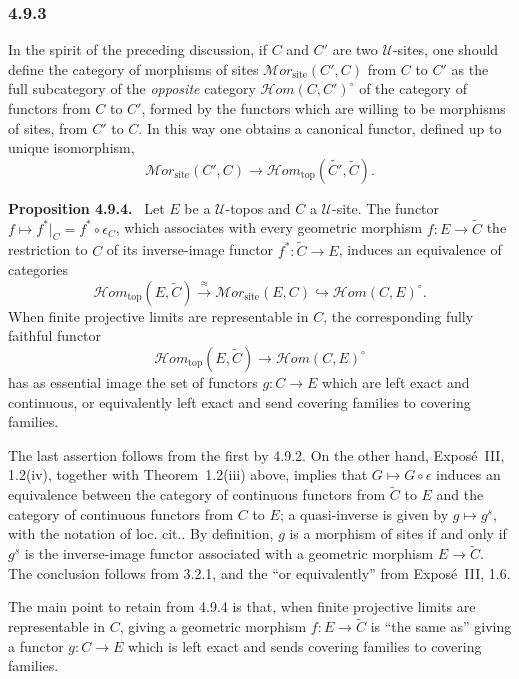 \documentclass[11pt]{article}
\newcommand{\U}{\mathcal{U}}
\newcommand{\Hhom}{\mathcal{H}om}
\newcommand{\Hhomtop}{\mathcal{H}om_{\mathrm{top}}}
\newcommand{\Mmorsite}{\mathcal{M}or_{\mathrm{site}}}
\newcommand{\loccit}{loc. cit.}
\newenvironment{statement}[1]{\par\medskip\noindent\textbf{#1.}\ }{\par\medskip}
\begin{document}
\subsubsection*{4.9.3}
In the spirit of the preceding discussion, if \(C\) and \(C'\) are two \(\U\)-sites, one should define the category of morphisms of sites \(\Mmorsite(C',C)\) from \(C\) to \(C'\) as the full subcategory of the \emph{opposite} category \(\Hhom(C,C')^\circ\) of the category of functors from \(C\) to \(C'\), formed by the functors which are willing to be morphisms of sites, from \(C'\) to \(C\). In this way one obtains a canonical functor, defined up to unique isomorphism,
\[
\Mmorsite(C',C)\longrightarrow
\Hhomtop(\widetilde{C'},\widetilde C).
\]

\begin{statement}{Proposition 4.9.4}
Let \(E\) be a \(\U\)-topos and \(C\) a \(\U\)-site. The functor \(f\mapsto f^\ast|_C=f^\ast\circ\epsilon_C\), which associates with every geometric morphism \(f:E\to\widetilde C\) the restriction to \(C\) of its inverse-image functor \(f^\ast:\widetilde C\to E\), induces an equivalence of categories
\[
\Hhomtop(E,\widetilde C)\xrightarrow{\approx}
\Mmorsite(E,C)\hookrightarrow\Hhom(C,E)^\circ.
\]
When finite projective limits are representable in \(C\), the corresponding fully faithful functor
\[
\Hhomtop(E,\widetilde C)\longrightarrow\Hhom(C,E)^\circ
\]
has as essential image the set of functors \(g:C\to E\) which are left exact and continuous, or equivalently left exact and send covering families to covering families.
\end{statement}

The last assertion follows from the first by 4.9.2. On the other hand, Expos\'e~III, 1.2(iv), together with Theorem~1.2(iii) above, implies that \(G\mapsto G\circ\epsilon\) induces an equivalence between the category of continuous functors from \(\widetilde C\) to \(E\) and the category of continuous functors from \(C\) to \(E\); a quasi-inverse is given by \(g\mapsto g^s\), with the notation of \loccit. By definition, \(g\) is a morphism of sites if and only if \(g^s\) is the inverse-image functor associated with a geometric morphism \(E\to\widetilde C\). The conclusion follows from 3.2.1, and the ``or equivalently'' from Expos\'e~III, 1.6.

The main point to retain from 4.9.4 is that, when finite projective limits are representable in \(C\), giving a geometric morphism \(f:E\to\widetilde C\) is ``the same as'' giving a functor \(g:C\to E\) which is left exact and sends covering families to covering families.
\end{document}
